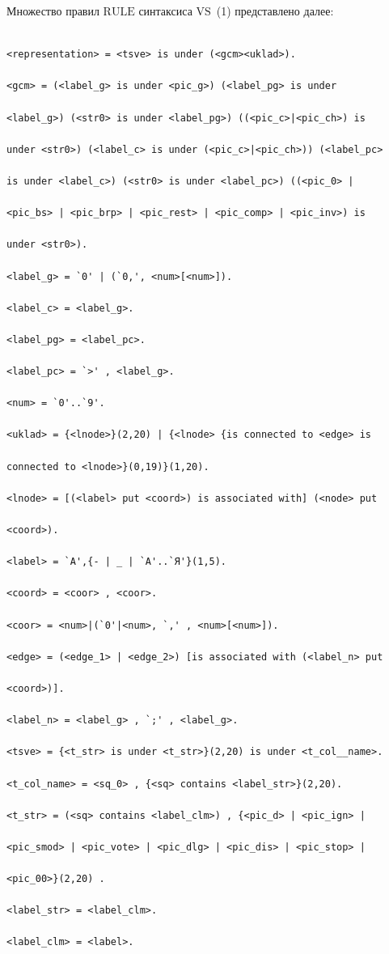   

  Множество правил $\mathrm{RULE}$ синтаксиса $\mathrm{VS}$~(1) представлено далее:

  {\small

  \begin{verbatim}

<representation> = <tsve> is under (<gcm><uklad>).

<gcm> = (<label_g> is under <pic_g>) (<label_pg> is under 

<label_g>) (<str0> is under <label_pg>) ((<pic_c>|<pic_ch>) is 

under <str0>) (<label_c> is under (<pic_c>|<pic_ch>)) (<label_pc> 

is under <label_c>) (<str0> is under <label_pc>) ((<pic_0> | 

<pic_bs> | <pic_brp> | <pic_rest> | <pic_comp> | <pic_inv>) is 

under <str0>).

<label_g> = `0' | (`0,', <num>[<num>]).

<label_c> = <label_g>.

<label_pg> = <label_pc>.

<label_pc> = `>' , <label_g>.

<num> = `0'..`9'.

<uklad> = {<lnode>}(2,20) | {<lnode> {is connected to <edge> is 

connected to <lnode>}(0,19)}(1,20).

<lnode> = [(<label> put <coord>) is associated with] (<node> put 

<coord>).

<label> = `А',{- | _ | `А'..`Я'}(1,5).

<coord> = <coor> , <coor>.

<coor> = <num>|(`0'|<num>, `,' , <num>[<num>]).

<edge> = (<edge_1> | <edge_2>) [is associated with (<label_n> put 

<coord>)].

<label_n> = <label_g> , `;' , <label_g>.

<tsve> = {<t_str> is under <t_str>}(2,20) is under <t_col__name>.

<t_col_name> = <sq_0> , {<sq> contains <label_str>}(2,20).

<t_str> = (<sq> contains <label_clm>) , {<pic_d> | <pic_ign> | 

<pic_smod> | <pic_vote> | <pic_dlg> | <pic_dis> | <pic_stop> | 

<pic_00>}(2,20) .

<label_str> = <label_clm>.

<label_clm> = <label>.

\end{verbatim}



}



